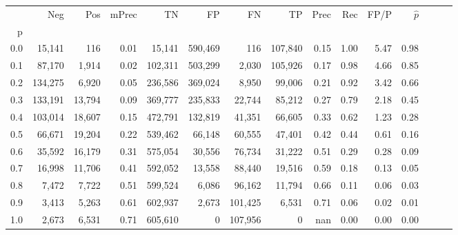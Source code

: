 \begin{tabular}{rrrrrrrrrrrrrrr}
\toprule
{} &      Neg &     Pos & mPrec &       TN &       FP &       FN &       TP &  Prec &   Rec &  FP/P & $\hat{p}$ \\
p   &          &         &       &          &          &          &          &       &       &       &           \\
\midrule
0.0 &   15,141 &     116 &  0.01 &   15,141 &  590,469 &      116 &  107,840 &  0.15 &  1.00 &  5.47 &      0.98 \\
0.1 &   87,170 &   1,914 &  0.02 &  102,311 &  503,299 &    2,030 &  105,926 &  0.17 &  0.98 &  4.66 &      0.85 \\
0.2 &  134,275 &   6,920 &  0.05 &  236,586 &  369,024 &    8,950 &   99,006 &  0.21 &  0.92 &  3.42 &      0.66 \\
0.3 &  133,191 &  13,794 &  0.09 &  369,777 &  235,833 &   22,744 &   85,212 &  0.27 &  0.79 &  2.18 &      0.45 \\
0.4 &  103,014 &  18,607 &  0.15 &  472,791 &  132,819 &   41,351 &   66,605 &  0.33 &  0.62 &  1.23 &      0.28 \\
0.5 &   66,671 &  19,204 &  0.22 &  539,462 &   66,148 &   60,555 &   47,401 &  0.42 &  0.44 &  0.61 &      0.16 \\
0.6 &   35,592 &  16,179 &  0.31 &  575,054 &   30,556 &   76,734 &   31,222 &  0.51 &  0.29 &  0.28 &      0.09 \\
0.7 &   16,998 &  11,706 &  0.41 &  592,052 &   13,558 &   88,440 &   19,516 &  0.59 &  0.18 &  0.13 &      0.05 \\
0.8 &    7,472 &   7,722 &  0.51 &  599,524 &    6,086 &   96,162 &   11,794 &  0.66 &  0.11 &  0.06 &      0.03 \\
0.9 &    3,413 &   5,263 &  0.61 &  602,937 &    2,673 &  101,425 &    6,531 &  0.71 &  0.06 &  0.02 &      0.01 \\
1.0 &    2,673 &   6,531 &  0.71 &  605,610 &        0 &  107,956 &        0 &   nan &  0.00 &  0.00 &      0.00 \\
\bottomrule
\end{tabular}
